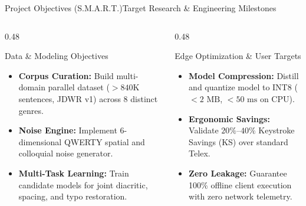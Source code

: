 \documentclass[aspectratio=169,10pt]{beamer}
\begin{document}
\begin{frame}{Project Objectives (S.M.A.R.T.)}{Target Research \& Engineering Milestones}
  \begin{columns}[T]
    \begin{column}{0.48\textwidth}
      \begin{block}{Data \& Modeling Objectives}
        \begin{itemize}\setlength{\itemsep}{4pt}\footnotesize
          \item \textbf{Corpus Curation:} Build multi-domain parallel dataset ($>840\text{K}$ sentences, JDWR v1) across 8 distinct genres.
          \item \textbf{Noise Engine:} Implement 6-dimensional QWERTY spatial and colloquial noise generator.
          \item \textbf{Multi-Task Learning:} Train candidate models for joint diacritic, spacing, and typo restoration.
        \end{itemize}
      \end{block}
    \end{column}

    \begin{column}{0.48\textwidth}
      \begin{block}{Edge Optimization \& User Targets}
        \begin{itemize}\setlength{\itemsep}{4pt}\footnotesize
          \item \textbf{Model Compression:} Distill and quantize model to INT8 ($<2\text{ MB}$, $<50\text{ ms}$ on CPU).
          \item \textbf{Ergonomic Savings:} Validate $20\%$--$40\%$ Keystroke Savings (KS) over standard Telex.
          \item \textbf{Zero Leakage:} Guarantee 100\% offline client execution with zero network telemetry.
        \end{itemize}
      \end{block}
    \end{column}
  \end{columns}
\end{frame}
\end{document}
